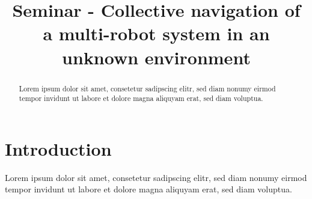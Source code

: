 \documentclass[conference]{IEEEtran}
\begin{document}
\title{Seminar - Collective navigation of a multi-robot system in an unknown environment}
\author{
}

\maketitle


\begin{abstract}
Lorem ipsum dolor sit amet, consetetur sadipscing elitr, sed diam nonumy eirmod tempor invidunt ut labore et dolore magna aliquyam erat, sed diam voluptua.
\end{abstract}


\section{Introduction}
Lorem ipsum dolor sit amet, consetetur sadipscing elitr, sed diam nonumy eirmod tempor invidunt ut labore et dolore magna aliquyam erat, sed diam voluptua.
\end{document}
